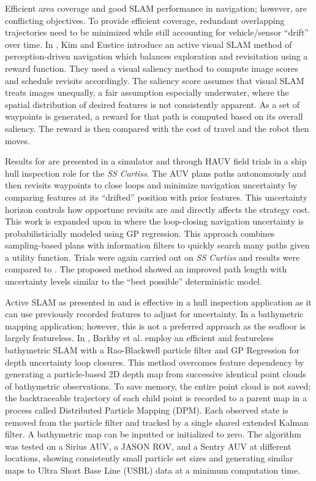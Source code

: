 \documentclass[double,12pt]{beavtex}
\begin{document}
Efficient area coverage and good SLAM performance in navigation; however, are conflicting objectives. To provide efficient coverage, redundant overlapping trajectories need to be minimized while still accounting for vehicle/sensor ``drift'' over time. In \cite{kim}, Kim and Eustice introduce an active visual SLAM method of perception-driven navigation which balances exploration and revisitation using a reward function. They used a visual saliency method to compute image scores and schedule revisits accordingly. The saliency score assumes that visual SLAM treats images unequally, a fair assumption especially underwater, where the spatial distribution of desired features is not consistently apparent. As a set of waypoints is generated, a reward for that path is computed based on its overall saliency. The reward is then compared with the cost of travel and the robot then moves. 

Results for \cite{kim} are presented in a simulator and through HAUV field trials in a ship hull inspection role for the \textit{SS Curtiss}. The AUV plans paths autonomously and then revisits waypoints to close loops and minimize navigation uncertainty by comparing features at its ``drifted'' position with prior features. This uncertainty horizon controls how opportune revisits are and directly affects the strategy cost. This work is expanded upon in \cite{chaves} where the loop-closing navigation uncertainty is probabilisticially modeled using GP regression. This approach combines sampling-based plans with information filters to quickly search many paths given a utility function. Trials were again carried out on \textit{SS Curtiss} and results were compared to \cite{kim}. The proposed method showed an improved path length with uncertainty levels similar to the ``best possible'' deterministic model.

Active SLAM as presented in \cite{kim} and \cite{chaves} is effective in a hull inspection application as it can use previously recorded features to adjust for uncertainty. In a bathymetric mapping application; however, this is not a preferred approach as the seafloor is largely featureless. In \cite{barkby}, Barkby et al. employ an efficient and featureless bathymetric SLAM with a Rao-Blackwell particle filter and GP Regression for depth uncertainty loop closures. This method overcomes feature dependency by generating a particle-based 2D depth map from successive identical point clouds of bathymetric observations. To save memory, the entire point cloud is not saved; the backtraceable trajectory of each child point is recorded to a parent map in a process called Distributed Particle Mapping (DPM). Each observed state is removed from the particle filter and tracked by a single shared extended Kalman filter. A bathymetric map can be inputted or initialized to zero. The algorithm was tested on a Sirius AUV, a JASON ROV, and a Sentry AUV at different locations, showing consistently small particle set sizes and generating similar maps to Ultra Short Base Line (USBL) data at a minimum computation time. 
\end{document}
